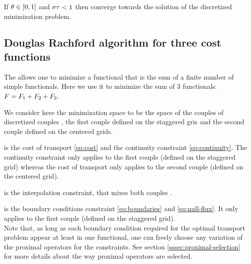         If $\theta\in[0,1]$ and $\sigma\tau<1$ then  converge towards the solution of the 
        discretized minimization problem.

    \subsection{Douglas Rachford algorithm for three cost functions}
    \noindent

        The \drAlgo{} allows one to minimize a functional \costToMin that is the sum of a finite number of simple
        functionals. Here we use it to minimize the sum of $3$ functionals:
        $F=F_1+F_2+F_3$.

        We consider here the minimization space to be the space of the couples of discretized couples \coupleFM{},
        the first couple defined on the staggered gris and the second couple defined on the centered grids.

        \costIToMin{} is
        the cost of transport \eqref{eq:cost} and the continuity constraint \eqref{eq:continuity}. The continuity
        constraint only applies to the first couple \coupleFM{} (defined on the staggered grid) whereas the cost of transport
        only applies to the second couple \coupleFM{} (defined on the centered grid).

        \costIIToMin{} is the interpolation constraint, that mixes both couples \coupleFM{}.

        \costIIIToMin{} is the boundary conditions constraint \eqref{eq:boundaries} and \eqref{eq:null-flux}. It only
        applies to the first couple \coupleFM{} (defined on the staggered grid).\\

        Note that, as long as each boundary condition required for the optimal transport problem appear at least in one functional, 
        one can freely choose any variation of the proximal operators for the constraints. See section \ref{sssec:proximal-selection}
        for more details about the way proximal operators are selected.\\

